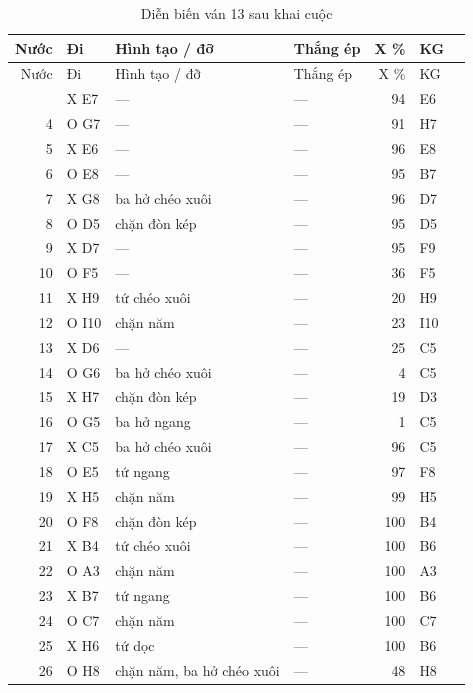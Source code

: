 \par{\scriptsize
\renewcommand{\arraystretch}{0.95}
\begin{longtable}{rlp{4.4cm}lrll}
  \caption{Diễn biến ván 13 sau khai cuộc}\label{tab:cs-vs-13}\\
    \toprule
    Nước & Đi & Hình tạo / đỡ & Thắng ép & X \% & KG &  \\
    \midrule
  \endfirsthead
    \toprule
    Nước & Đi & Hình tạo / đỡ & Thắng ép & X \% & KG &  \\
    \midrule
  \endhead
    \bottomrule
  \endfoot
    3 & X E7 & --- & --- & 94 & E6 &  \\
    4 & O G7 & --- & --- & 91 & H7 &  \\
    5 & X E6 & --- & --- & 96 & E8 &  \\
    6 & O E8 & --- & --- & 95 & B7 &  \\
    7 & X G8 & ba hở chéo xuôi & --- & 96 & D7 &  \\
    8 & O D5 & chặn đòn kép & --- & 95 & D5 &  \\
    9 & X D7 & --- & --- & 95 & F9 &  \\
    10 & O F5 & --- & --- & 36 & F5 &  \\
    11 & X H9 & tứ chéo xuôi & --- & 20 & H9 &  \\
    12 & O I10 & chặn năm & --- & 23 & I10 &  \\
    13 & X D6 & --- & --- & 25 & C5 &  \\
    14 & O G6 & ba hở chéo xuôi & --- & 4 & C5 &  \\
    15 & X H7 & chặn đòn kép & --- & 19 & D3 &  \\
    16 & O G5 & ba hở ngang & --- & 1 & C5 &  \\
    17 & X C5 & ba hở chéo xuôi & --- & 96 & C5 &  \\
    18 & O E5 & tứ ngang & --- & 97 & F8 &  \\
    19 & X H5 & chặn năm & --- & 99 & H5 &  \\
    20 & O F8 & chặn đòn kép & --- & 100 & B4 &  \\
    21 & X B4 & tứ chéo xuôi & --- & 100 & B6 &  \\
    22 & O A3 & chặn năm & --- & 100 & A3 &  \\
    23 & X B7 & tứ ngang & --- & 100 & B6 &  \\
    24 & O C7 & chặn năm & --- & 100 & C7 &  \\
    25 & X H6 & tứ dọc & --- & 100 & B6 &  \\
    26 & O H8 & chặn năm, ba hở chéo xuôi & --- & 48 & H8 &  \\

\end{longtable}}
